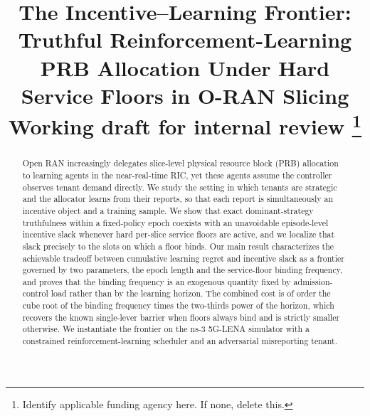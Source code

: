 \documentclass[conference]{IEEEtran}
\theoremstyle{definition}
\theoremstyle{remark}
\begin{document}
\title{The Incentive--Learning Frontier: Truthful Reinforcement-Learning PRB Allocation Under Hard Service Floors in O-RAN Slicing\\
{\footnotesize \textsuperscript{}Working draft for internal review}
\thanks{Identify applicable funding agency here. If none, delete this.}
}

\author{
\and
{}
}

\maketitle

\begin{abstract}
Open RAN increasingly delegates slice-level physical resource block (PRB) allocation to learning agents in the near-real-time RIC, yet these agents assume the controller observes tenant demand directly. We study the setting in which tenants are strategic and the allocator learns from their reports, so that each report is simultaneously an incentive object and a training sample. We show that exact dominant-strategy truthfulness within a fixed-policy epoch coexists with an unavoidable episode-level incentive slack whenever hard per-slice service floors are active, and we localize that slack precisely to the slots on which a floor binds. Our main result characterizes the achievable tradeoff between cumulative learning regret and incentive slack as a frontier governed by two parameters, the epoch length and the service-floor binding frequency, and proves that the binding frequency is an exogenous quantity fixed by admission-control load rather than by the learning horizon. The combined cost is of order the cube root of the binding frequency times the two-thirds power of the horizon, which recovers the known single-lever barrier when floors always bind and is strictly smaller otherwise. We instantiate the frontier on the ns-3 5G-LENA simulator with a constrained reinforcement-learning scheduler and an adversarial misreporting tenant.
\end{abstract}
\end{document}
